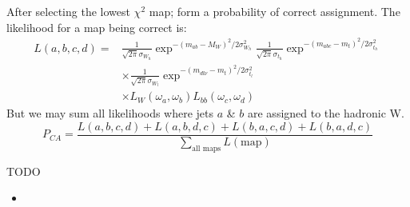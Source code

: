 \documentclass{beamer}
\begin{document}
\begin{frame}
After selecting the lowest $\chi^2$ map; form a probability of correct assignment. The likelihood for a map being correct is:
  \begin{equation}\begin{split}
    L\left(a,b,c,d\right) =&
    \frac{1}{\sqrt{2\pi}\sigma_{W_{h}}} \exp^{-\left(m_{ab}-M_{W}\right)^{2} / 2\sigma^{2}_{W_{h}}}
    \frac{1}{\sqrt{2\pi}\sigma_{t_{h}}} \exp^{-\left(m_{abc}-m_{t}\right)^{2} / 2\sigma^{2}_{t_{h}}}
    \\&\times
    \frac{1}{\sqrt{2\pi}\sigma_{W_{l}}} \exp^{-\left(m_{dl\nu}-m_{t}\right)^{2} / 2\sigma^{2}_{t_{l}}}
    \\&\times
    L_{W}\left(\omega_{a},\omega_{b}\right) L_{bb}\left(\omega_{c},\omega_{d}\right)
  \end{split}\end{equation}
But we may sum all likelihoods where jets $a$ \& $b$ are assigned to the hadronic W.
\begin{equation}
P_{CA} = \frac{L\left(a,b,c,d\right) + L\left(a,b,d,c\right) + L\left(b,a,c,d\right) + L\left(b,a,d,c\right)}{\sum_{\text{all maps}} L\left(\text{map}\right)}
\end{equation}
\end{frame}

\begin{frame}{TODO}
  \begin{itemize}
    \item 
  \end{itemize}
\end{frame}
\end{document}
